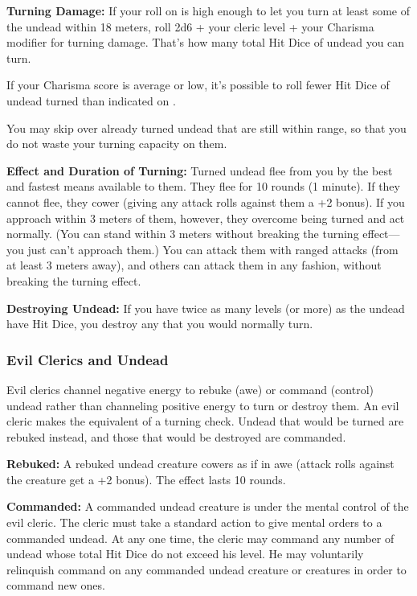 \textbf{Turning Damage:} If your roll on  is high enough to let you turn at least some of the undead within 18 meters, roll 2d6 + your cleric level + your Charisma modifier for turning damage. That's how many total Hit Dice of undead you can turn.

If your Charisma score is average or low, it's possible to roll fewer Hit Dice of undead turned than indicated on .

You may skip over already turned undead that are still within range, so that you do not waste your turning capacity on them.

\textbf{Effect and Duration of Turning:} Turned undead flee from you by the best and fastest means available to them. They flee for 10 rounds (1 minute). If they cannot flee, they cower (giving any attack rolls against them a +2 bonus). If you approach within 3 meters of them, however, they overcome being turned and act normally. (You can stand within 3 meters without breaking the turning effect---you just can't approach them.) You can attack them with ranged attacks (from at least 3 meters away), and others can attack them in any fashion, without breaking the turning effect.

\textbf{Destroying Undead:} If you have twice as many levels (or more) as the undead have Hit Dice, you destroy any that you would normally turn.

\subsubsection{Evil Clerics and Undead}
Evil clerics channel negative energy to rebuke (awe) or command (control) undead rather than channeling positive energy to turn or destroy them. An evil cleric makes the equivalent of a turning check. Undead that would be turned are rebuked instead, and those that would be destroyed are commanded.

\textbf{Rebuked:} A rebuked undead creature cowers as if in awe (attack rolls against the creature get a +2 bonus). The effect lasts 10 rounds.

\textbf{Commanded:} A commanded undead creature is under the mental control of the evil cleric. The cleric must take a standard action to give mental orders to a commanded undead. At any one time, the cleric may command any number of undead whose total Hit Dice do not exceed his level. He may voluntarily relinquish command on any commanded undead creature or creatures in order to command new ones.

